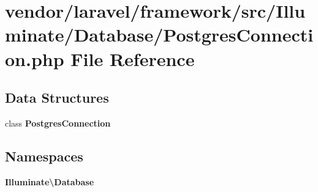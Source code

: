 \section{vendor/laravel/framework/src/\+Illuminate/\+Database/\+Postgres\+Connection.php File Reference}
\label{_postgres_connection_8php}
\subsection*{Data Structures}
\begin{DoxyCompactItemize}
\item 
class {\bf Postgres\+Connection}
\end{DoxyCompactItemize}
\subsection*{Namespaces}
\begin{DoxyCompactItemize}
\item 
 {\bf Illuminate\textbackslash{}\+Database}
\end{DoxyCompactItemize}
